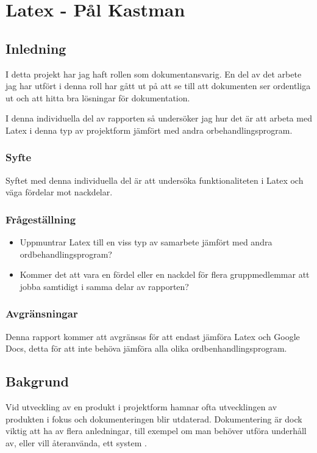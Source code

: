 \section{Latex - Pål Kastman}
\subsection{Inledning}
I detta projekt har jag haft rollen som dokumentansvarig. En del av det arbete jag har utfört i denna roll har gått ut på att se till att dokumenten ser ordentliga ut och att hitta bra lösningar för dokumentation.

I denna individuella del av rapporten så undersöker jag hur det är att arbeta med Latex i denna typ av projektform jämfört med andra orbehandlingsprogram.

\subsubsection{Syfte}
Syftet med denna individuella del är att undersöka funktionaliteten i Latex och väga fördelar mot nackdelar.

\subsubsection{Frågeställning}
\begin{itemize}
\item Uppmuntrar Latex till en viss typ av samarbete jämfört med andra ordbehandlingsprogram?
\item Kommer det att vara en fördel eller en nackdel för flera gruppmedlemmar att jobba samtidigt i samma delar av rapporten?
\end{itemize}

\subsubsection{Avgränsningar}
Denna rapport kommer att avgränsas för att endast jämföra Latex och Google Docs, detta för att inte behöva jämföra alla olika ordbenhandlingsprogram.

\subsection{Bakgrund}
Vid utveckling av en produkt i projektform hamnar ofta utvecklingen av produkten i fokus och dokumenteringen blir utdaterad. Dokumentering är dock viktig att ha av flera anledningar, till exempel om man behöver utföra underhåll av, eller vill återanvända, ett system \cite{m_spichkova}.


